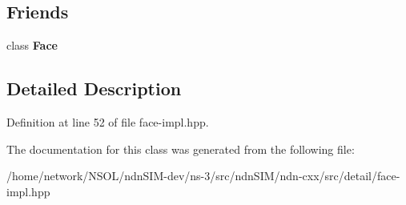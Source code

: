 \subsection*{Friends}
\begin{DoxyCompactItemize}
\item 
class {\bfseries Face}\hypertarget{classndn_1_1Face_1_1Impl_a6dc10c9c159a568077424ab8c1c82dea}{}\label{classndn_1_1Face_1_1Impl_a6dc10c9c159a568077424ab8c1c82dea}

\end{DoxyCompactItemize}


\subsection{Detailed Description}


Definition at line 52 of file face-\/impl.\+hpp.



The documentation for this class was generated from the following file\+:\begin{DoxyCompactItemize}
\item 
/home/network/\+N\+S\+O\+L/ndn\+S\+I\+M-\/dev/ns-\/3/src/ndn\+S\+I\+M/ndn-\/cxx/src/detail/face-\/impl.\+hpp\end{DoxyCompactItemize}
